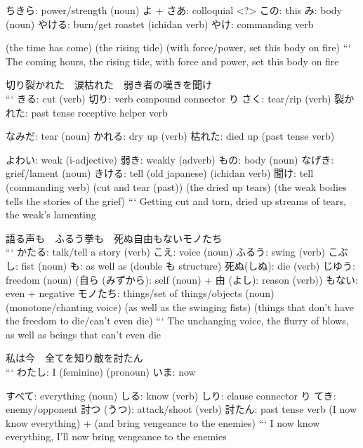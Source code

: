                         ちきら: power/strength (noun)
                        よ + さあ: colloquial <?>
                                  この: this
                                      み: body (noun)
                                          やける: burn/get roastet (ichidan verb)
                                          やけ: commanding verb

(the time has come) (the rising tide) (with force/power, set this body on fire)
```
The coming hours, the rising tide, with force and power, set this body on fire

切り裂かれた　涙枯れた　弱き者の嘆きを聞け \\
```
きる: cut (verb)
切り: verb compound connector り
さく: tear/rip (verb)
裂かれた: past tense receptive helper verb

              なみだ: tear (noun)
              かれる: dry up (verb)
              枯れた: died up (past tense verb)

                        よわい: weak (i-adjective)
                        弱き: weakly (adverb)
                            もの: body (noun)
                                なげき: grief/lament (noun)
                                      きける: tell (old japanese) (ichidan verb)
                                      聞け: tell (commanding verb)
(cut and tear (past)) (the dried up tears) (the weak bodies tells the stories of the grief)
```
Getting cut and torn, dried up streams of tears, the weak's lamenting

語る声も　ふるう拳も　死ぬ自由もないモノたち \\
```
かたる: talk/tell a story (verb)
    こえ: voice (noun)
          ふるう: swing (verb)
                こぶし: fist (noun)
                も: as well as (double も structure)
                      死ぬ(しぬ): die (verb)
                      じゆう: freedom (noun) (自ら (みずから): self (noun) + 由 (よし): reason (verb))
                              もない: even + negative
                                    モノたち: things/set of things/objects (noun)
(monotone/chanting voice) (as well as the swinging fists) (things that don't have the freedom to die/can't even die)
```
The unchanging voice, the flurry of blows, as well as beings that can't even die

私は今　全てを知り敵を討たん \\
```
わたし: I (feminine) (pronoun)
    いま: now

        すべて: everything (noun)
              しる: know (verb)
              しり: clause connector り
                てき: enemy/opponent
                      討つ (うつ): attack/shoot (verb)
                      討たん: past tense verb
(I now know everything) + (and bring vengeance to the enemies)
```
I now know everything, I'll now bring vengeance to the enemies


